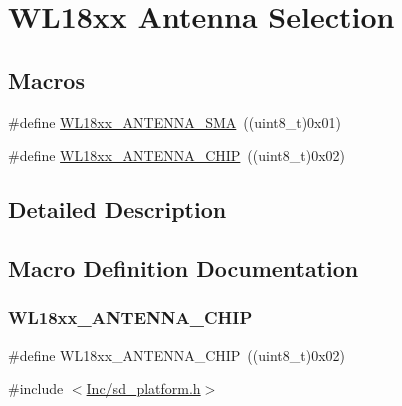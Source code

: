 \hypertarget{group___s_d___antenna___select}{}\section{W\+L18xx Antenna Selection}
\label{group___s_d___antenna___select}
\subsection*{Macros}
\begin{DoxyCompactItemize}
\item 
\#define \mbox{\hyperlink{group___s_d___antenna___select_gad34710c5325cf565b89f2ce2f6fde3ae}{W\+L18xx\+\_\+\+A\+N\+T\+E\+N\+N\+A\+\_\+\+S\+MA}}~((uint8\+\_\+t)0x01)
\item 
\#define \mbox{\hyperlink{group___s_d___antenna___select_ga1de725e07aecec98314b752abb71e644}{W\+L18xx\+\_\+\+A\+N\+T\+E\+N\+N\+A\+\_\+\+C\+H\+IP}}~((uint8\+\_\+t)0x02)
\end{DoxyCompactItemize}


\subsection{Detailed Description}


\subsection{Macro Definition Documentation}
\mbox{\label{group___s_d___antenna___select_ga1de725e07aecec98314b752abb71e644}} 
\subsubsection{\texorpdfstring{W\+L18xx\+\_\+\+A\+N\+T\+E\+N\+N\+A\+\_\+\+C\+H\+IP}{WL18xx\_ANTENNA\_CHIP}}
{\footnotesize\ttfamily \#define W\+L18xx\+\_\+\+A\+N\+T\+E\+N\+N\+A\+\_\+\+C\+H\+IP~((uint8\+\_\+t)0x02)}



{\ttfamily \#include $<$\mbox{\hyperlink{sd__platform_8h}{Inc/sd\+\_\+platform.\+h}}$>$}

